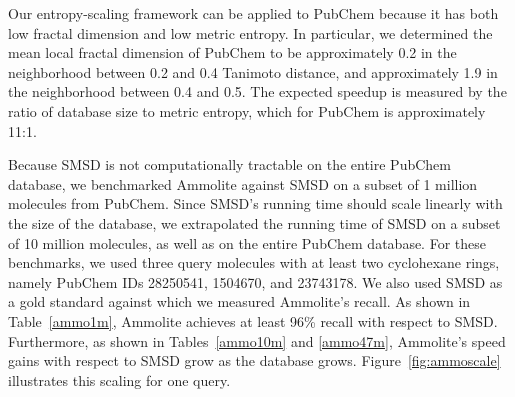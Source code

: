 \documentclass[review,preprint,12pt]{elsarticle}
\theoremstyle{definition}
\theoremstyle{remark}
\numberwithin{equation}{section}
\begin{document}
Our entropy-scaling framework can be applied to PubChem because it has both low fractal
dimension and low metric entropy.
In particular, we determined the mean local fractal dimension of PubChem to be 
approximately 0.2 in the neighborhood between 0.2 and 0.4 Tanimoto distance,
and approximately 1.9 in the neighborhood between 0.4 and 0.5.
The expected speedup is measured by the ratio of database size to metric entropy, which for PubChem is approximately 11:1.

Because SMSD is not computationally tractable on the entire PubChem database,
we benchmarked Ammolite against SMSD on a subset of 1 million molecules from PubChem.
Since SMSD's running time should scale linearly with the size of the database, we extrapolated the
running time of SMSD on a subset of 10 million molecules, as well as on the entire PubChem database.
For these benchmarks, we used three query molecules with at least two cyclohexane rings, namely PubChem IDs 28250541, 1504670, and 23743178.
We also used SMSD as a gold standard against which we measured Ammolite's recall.
As shown in Table~\ref{ammo1m}, Ammolite achieves at least 96\% recall with respect to SMSD.
Furthermore, as shown in Tables~\ref{ammo10m} and \ref{ammo47m}, Ammolite's speed gains with respect to SMSD grow as the database grows.
Figure~\ref{fig:ammoscale} illustrates this scaling for one query.
\end{document}
